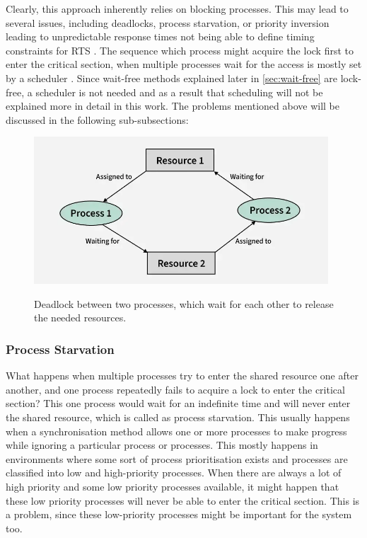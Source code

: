 Clearly, this approach inherently relies on blocking processes. This may lead to several issues, including deadlocks, process starvation, or priority inversion leading to unpredictable response times not being able to define timing constraints for \ac{RTS} \cite{brandenburg2019multiprocessorrealtimelockingprotocols}. The sequence which process might acquire the lock first to enter the critical section, when multiple processes wait for the access is mostly set by a scheduler \cite{brandenburg2019multiprocessorrealtimelockingprotocols}. Since wait-free methods explained later in \cref{sec:wait-free} are lock-free, a scheduler is not needed and as a result that scheduling will not be explained more in detail in this work. The problems mentioned above will be discussed in the following sub-subsections:

\begin{figure}[!ht]
    \centering
    \captionsetup{justification=centering}
    \caption{Deadlock between two processes, which wait for each other to release the needed resources.}
    \includegraphics[width=110mm]{images/deadlock.png}
    \cite{Deadlock}
    \label{fig:deadlock}
\end{figure}

\subsubsection{Process Starvation}\label{subsubsec:process-starvation}

What happens when multiple processes try to enter the shared resource one after another, and one process repeatedly fails to acquire a lock to enter the critical section? This one  process would wait for an indefinite time and will never enter the shared resource, which is called as process starvation. This usually happens when a synchronisation method allows one or more processes to make progress while ignoring a particular process or processes. This mostly happens in environments where some sort of process prioritisation exists and processes are classified into low and high-priority processes. When there are always a lot of high priority and some low priority processes available, it might happen that these low priority processes will never be able to enter the critical section. This is a problem, since these low-priority processes might be important for the system too. \cite{Starvation}

